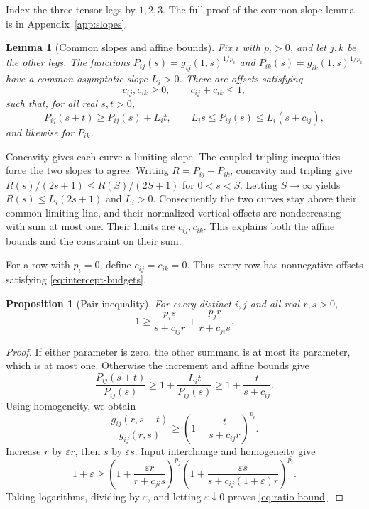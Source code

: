 \documentclass[11pt]{article}
\newtheorem{lemma}[theorem]{Lemma}
\newtheorem{proposition}[theorem]{Proposition}
\begin{document}
Index the three tensor legs by $1,2,3$.
The full proof of the common-slope lemma is in
Appendix~\ref{app:slopes}.

\begin{lemma}[Common slopes and affine bounds]\label{lem:intercepts}
Fix $i$ with $p_i>0$, and let $j,k$ be the other legs. The functions
$P_{ij}(s)=g_{ij}(1,s)^{1/p_i}$ and $P_{ik}(s)=g_{ik}(1,s)^{1/p_i}$
have a common asymptotic slope $L_i>0$. There are offsets satisfying
\begin{equation}\label{eq:intercept-budgets}
 c_{ij},c_{ik}\ge0,\qquad c_{ij}+c_{ik}\le1,
\end{equation}
such that, for all real $s,t>0$,
\[
 P_{ij}(s+t)\ge P_{ij}(s)+L_it,\qquad
 L_i s\le P_{ij}(s)\le L_i(s+c_{ij}),
\]
and likewise for $P_{ik}$.
\end{lemma}

Concavity gives each curve a limiting slope. The coupled tripling
inequalities force the two slopes to agree. Writing $R=P_{ij}+P_{ik}$,
concavity and tripling give
$R(s)/(2s+1)\le R(S)/(2S+1)$ for $0<s<S$. Letting $S\to\infty$
yields $R(s)\le L_i(2s+1)$ and $L_i>0$.
Consequently the two curves stay above their
common limiting line, and their normalized vertical offsets are
nondecreasing with sum at most one. Their limits are $c_{ij},c_{ik}$.
This explains both the affine bounds and the constraint on their sum.

For a row with $p_i=0$, define $c_{ij}=c_{ik}=0$. Thus every row has
nonnegative offsets satisfying \eqref{eq:intercept-budgets}.

\begin{proposition}[Pair inequality]\label{prop:pair-bound}
For every distinct $i,j$ and all real $r,s>0$,
\begin{equation}\label{eq:ratio-bound}
 1\ge\frac{p_i s}{s+c_{ij}r}+\frac{p_j r}{r+c_{ji}s}
 .
\end{equation}
\end{proposition}

\begin{proof}
If either parameter is zero, the other summand is at most its parameter,
which is at most one. Otherwise the increment and affine bounds give
\[
 \frac{P_{ij}(s+t)}{P_{ij}(s)}
 \ge1+\frac{L_it}{P_{ij}(s)}\ge1+\frac{t}{s+c_{ij}}.
\]
Using homogeneity, we obtain
\begin{equation}\label{eq:finite-increment}
 \frac{g_{ij}(r,s+t)}{g_{ij}(r,s)}
 \ge\left(1+\frac{t}{s+c_{ij}r}\right)^{p_i}.
\end{equation}
Increase $r$ by $\varepsilon r$, then $s$ by $\varepsilon s$.
Input interchange and homogeneity give
\[
 1+\varepsilon\ge
 \left(1+\frac{\varepsilon r}{r+c_{ji}s}\right)^{p_j}
 \left(1+\frac{\varepsilon s}{s+c_{ij}(1+\varepsilon)r}\right)^{p_i}.
\]
Taking logarithms, dividing by $\varepsilon$, and letting
$\varepsilon\downarrow0$ proves \eqref{eq:ratio-bound}.
\end{proof}
\end{document}
